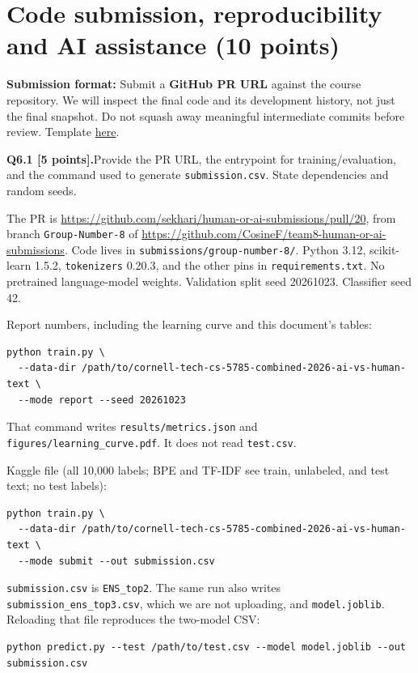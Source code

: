\documentclass[11pt,letterpaper]{article}
\newcommand{\question}[2]{\needspace{4\baselineskip}\par\addvspace{0.45em}\noindent\textbf{#1}\quad #2\par\nobreak\vspace{0.1em}}
\begin{document}
\section{Code submission, reproducibility and AI assistance (10 points)}
\textbf{Submission format:} Submit a \textbf{GitHub PR URL} against the course repository. We will inspect the final code and its development history, not just the final snapshot. Do not squash away meaningful intermediate commits before review. Template \href{https://github.com/sekhari/human-or-ai-submissions}{here}.

\question{Q6.1 [5 points].}{Provide the PR URL, the entrypoint for training/evaluation, and the command used to generate \texttt{submission.csv}. State dependencies and random seeds.}

The PR is \url{https://github.com/sekhari/human-or-ai-submissions/pull/20}, from branch \texttt{Group-Number-8} of \url{https://github.com/CosineF/team8-human-or-ai-submissions}. Code lives in \texttt{submissions/group-number-8/}. Python 3.12, scikit-learn 1.5.2, \texttt{tokenizers} 0.20.3, and the other pins in \texttt{requirements.txt}. No pretrained language-model weights. Validation split seed 20261023. Classifier seed 42.

Report numbers, including the learning curve and this document's tables:

\begin{verbatim}
python train.py \
  --data-dir /path/to/cornell-tech-cs-5785-combined-2026-ai-vs-human-text \
  --mode report --seed 20261023
\end{verbatim}

That command writes \texttt{results/metrics.json} and \texttt{figures/learning\_curve.pdf}. It does not read \texttt{test.csv}.

Kaggle file (all 10{,}000 labels; BPE and TF-IDF see train, unlabeled, and test text; no test labels):

\begin{verbatim}
python train.py \
  --data-dir /path/to/cornell-tech-cs-5785-combined-2026-ai-vs-human-text \
  --mode submit --out submission.csv
\end{verbatim}

\texttt{submission.csv} is \texttt{ENS\_top2}. The same run also writes \texttt{submission\_ens\_top3.csv}, which we are not uploading, and \texttt{model.joblib}. Reloading that file reproduces the two-model CSV:

\begin{verbatim}
python predict.py --test /path/to/test.csv --model model.joblib --out submission.csv
\end{verbatim}
\end{document}
